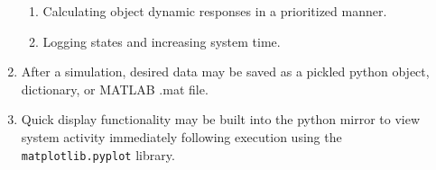 \documentclass[12pt]{article}
\begin{document}
\begin{enumerate}
\begin{enumerate}
		\item Calculating object dynamic responses in a prioritized manner.
		\item Logging states and increasing system time.
	\end{enumerate}
\item After a simulation, desired data may be saved as a pickled python object, dictionary, or MATLAB .mat file.
\item Quick display functionality may be built into the python mirror to view system activity immediately following execution using the \verb|matplotlib.pyplot| library.
\end{enumerate}
 
\pagebreak
\end{document}
